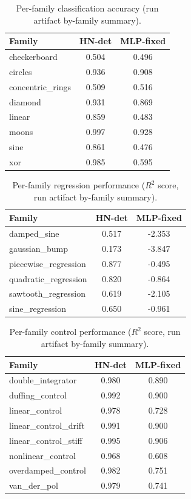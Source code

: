 
\begin{table}[ht]
\centering
\caption{Per-family classification accuracy (run artifact by-family summary).}
\begin{tabular}{lcc}
\toprule
Family & HN-det & MLP-fixed \\
\midrule
  checkerboard & 0.504 & 0.496 \\
  circles & 0.936 & 0.908 \\
  concentric\_rings & 0.509 & 0.516 \\
  diamond & 0.931 & 0.869 \\
  linear & 0.859 & 0.483 \\
  moons & 0.997 & 0.928 \\
  sine & 0.861 & 0.476 \\
  xor & 0.985 & 0.595 \\
\bottomrule
\end{tabular}
\label{tab:classify_per_family}
\end{table}

\begin{table}[ht]
\centering
\caption{Per-family regression performance ($R^2$ score, run artifact by-family summary).}
\begin{tabular}{lcc}
\toprule
Family & HN-det & MLP-fixed \\
\midrule
  damped\_sine & 0.517 & -2.353 \\
  gaussian\_bump & 0.173 & -3.847 \\
  piecewise\_regression & 0.877 & -0.495 \\
  quadratic\_regression & 0.820 & -0.864 \\
  sawtooth\_regression & 0.619 & -2.105 \\
  sine\_regression & 0.650 & -0.961 \\
\bottomrule
\end{tabular}
\label{tab:regression_per_family}
\end{table}

\begin{table}[ht]
\centering
\caption{Per-family control performance ($R^2$ score, run artifact by-family summary).}
\begin{tabular}{lcc}
\toprule
Family & HN-det & MLP-fixed \\
\midrule
  double\_integrator & 0.980 & 0.890 \\
  duffing\_control & 0.992 & 0.900 \\
  linear\_control & 0.978 & 0.728 \\
  linear\_control\_drift & 0.991 & 0.900 \\
  linear\_control\_stiff & 0.995 & 0.906 \\
  nonlinear\_control & 0.968 & 0.608 \\
  overdamped\_control & 0.982 & 0.751 \\
  van\_der\_pol & 0.979 & 0.741 \\
\bottomrule
\end{tabular}
\label{tab:control_per_family}
\end{table}
